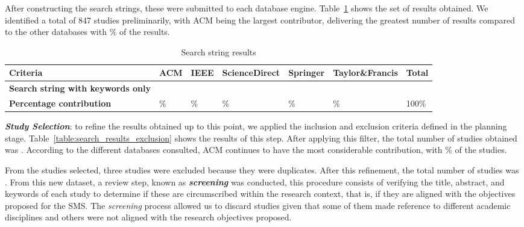 After constructing the search strings, these were submitted to each database engine. Table~\ref{table:search_results} shows the set of results obtained. We identified a total of 847 studies preliminarily, with ACM being the largest contributor, delivering the greatest number of results compared to the other databases with \acmp\% of the results.


\begin{table}[htbp]
	\centering
	\caption{Search string results}
	\label{table:search_results}
	\renewcommand{\arraystretch}{1}  %
	\begin{tabular}{p{4.8cm}p{1.7cm}p{1.7cm}p{1.7cm}p{1.7cm}p{2cm}p{1.4cm}}
		\toprule
		\textbf{Criteria}                         & \textbf{ACM} & \textbf{IEEE} & \textbf{ScienceDirect} & \textbf{Springer} & \textbf{Taylor\&Francis} & \textbf{Total} \\
		\midrule
		\textbf{Search string with keywords only} & \acm{}       & \ieee{}       & \sd{}                  & \spr{}            & \tf{}                    & \tot{}         \\
		\addlinespace[0.8em]
		\textbf{Percentage contribution}          & \acmp{}\%    & \ieeep{}\%    & \sdp{}\%               & \sprp{}\%         & \tfp{}\%                 & 100\%          \\
		\bottomrule
	\end{tabular}
\end{table}




\textit{\textbf{Study Selection}}: to refine the results obtained up to this point, we applied the inclusion and exclusion criteria defined in the planning stage. Table~\ref{table:search_results_exclusion} shows the results of this step. After applying this filter, the total number of studies obtained was \itot. According to the different databases consulted, ACM continues to have the most considerable contribution, with \iacmp\% of the studies.


From the \itot{} studies selected, three studies were excluded because they were duplicates. After this refinement, the total number of studies was \depTot{}. From this new dataset, a review step, known as \textit{\textbf{screening}} was conducted, this procedure consists of verifying the title, abstract, and keywords of each study to determine if these are circumscribed within the research context, that is, if they are aligned with the objectives proposed for the SMS. The \textit{screening} process allowed us to discard \screen{} studies given that some of them made reference to different academic disciplines and others were not aligned with the research objectives proposed.

